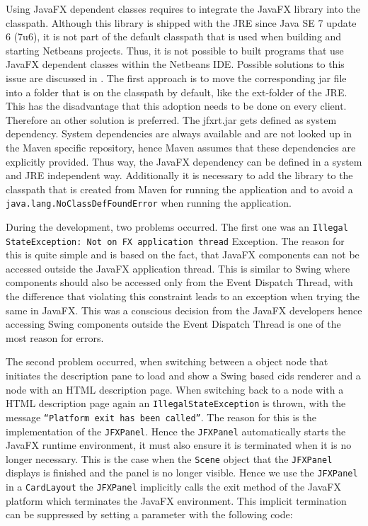 Using JavaFX dependent classes requires to integrate the JavaFX library into the classpath.
Although this library is shipped with the JRE since Java SE 7 update 6 (7u6), it is not part of the default classpath that is used when building and starting Netbeans projects. 
Thus, it is not possible to built programs that use JavaFX dependent classes within the Netbeans IDE.
Possible solutions to this issue are discussed in \autocite{impl:fx-classpath}.
The first approach is to move the corresponding jar file into a folder that is on the classpath by default, like the ext-folder of the JRE.
This has the disadvantage that this adoption needs to be done on every client.
Therefore an other solution is preferred.
The jfxrt.jar gets defined as system dependency.
System dependencies are always available and are not looked up in the Maven specific repository, hence Maven assumes that these dependencies are explicitly provided.
Thus way, the JavaFX dependency can be defined in a system and JRE independent way.
Additionally it is necessary to add the library to the classpath that is created from Maven for running the application and to avoid a \texttt{java.lang.NoClassDefFoundError} when running the application.
 
During the development, two problems occurred.
The first one was an \texttt{Illegal} \texttt{StateException: Not on FX application thread} Exception.
The reason for this is quite simple and is based on the fact, that JavaFX components can not be accessed outside the JavaFX application thread.
This is similar to Swing where components should also be accessed only from the Event Dispatch Thread, with the difference that violating this constraint leads to an exception when trying the same in JavaFX.
This was a conscious decision from the JavaFX developers hence accessing Swing components outside the Event Dispatch Thread is one of the most reason for errors.

The second problem occurred, when switching between a object node that initiates the description pane to load and show a Swing based cids renderer and a node with an HTML description page.
When switching back to a node with a HTML description page again an \texttt{IllegalStateException} is thrown, with the message \texttt{\enquote{Platform exit has been called}}.
The reason for this is the implementation of the \texttt{JFXPanel}.
Hence the \texttt{JFXPanel} automatically starts the JavaFX runtime environment, it must also ensure it is terminated when it is no longer necessary.
This is the case when the \texttt{Scene} object that the \texttt{JFXPanel} displays is finished and the panel is no longer visible.
Hence we use the \texttt{JFXPanel} in a \texttt{CardLayout} the \texttt{JFXPanel} implicitly calls the exit method of the JavaFX platform which terminates the JavaFX environment.
This implicit termination can be suppressed by setting a parameter with the following code:

